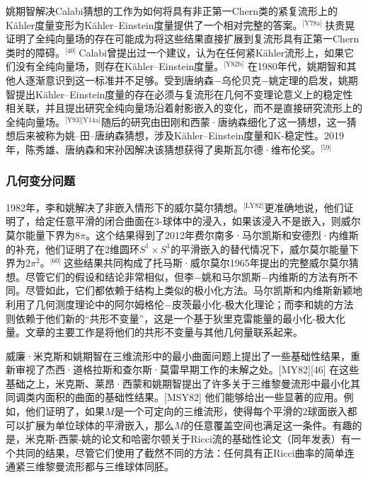 姚期智解决Calabi猜想的工作为如何将具有非正第一Chern类的紧复流形上的Kähler度量变形为Kähler–Einstein度量提供了一个相对完整的答案。\(^\text{[Y78a] }\)扶贵晃证明了全纯向量场的存在可能成为将这些结果直接扩展到复流形具有正第一Chern类时的障碍。\(^\text{[40] }\)Calabi曾提出过一个建议，认为在任何紧Kähler流形上，如果它们没有全纯向量场，则存在Kähler–Einstein度量。\(^\text{[Y82b]}\) 在1980年代，姚期智和其他人逐渐意识到这一标准并不足够。受到唐纳森−乌伦贝克−姚定理的启发，姚期智提出Kähler–Einstein度量的存在必须与复流形在几何不变理论意义上的稳定性相关联，并且提出研究全纯向量场沿着射影嵌入的变化，而不是直接研究流形上的全纯向量场。\(^\text{[Y93][Y14a]}\)随后的研究由田刚和西蒙·唐纳森细化了这一猜想，这一猜想后来被称为姚–田–唐纳森猜想，涉及Kähler–Einstein度量和K-稳定性。2019年，陈秀雄、唐纳森和宋孙因解决该猜想获得了奥斯瓦尔德·维布伦奖。\(^\text{[59] }\)
\subsubsection{几何变分问题}  
1982年，李和姚解决了非嵌入情形下的威尔莫尔猜想。\(^\text{[LY82]}\)更准确地说，他们证明了，给定任意平滑的闭合曲面在3-球体中的浸入，如果该浸入不是嵌入，则威尔莫尔能量下界为\(8\pi\)。这个结果得到了2012年费尔南多·马尔凯斯和安德烈·内维斯的补充，他们证明了在2维圆环\(S^1 \times S^1\)的平滑嵌入的替代情况下，威尔莫尔能量下界为\(2\pi^2\)。\(^\text{[60] }\)这些结果共同构成了托马斯·威尔莫尔1965年提出的完整威尔莫尔猜想。尽管它们的假设和结论非常相似，但李−姚和马尔凯斯−内维斯的方法有所不同。尽管如此，它们都依赖于结构上类似的极小化方法。马尔凯斯和内维斯新颖地利用了几何测度理论中的阿尔姆格伦−皮茨最小化-极大化理论；而李和姚的方法则依赖于他们新的“共形不变量”，这是一个基于狄里克雷能量的最小化-极大化量。文章的主要工作是将他们的共形不变量与其他几何量联系起来。

威廉·米克斯和姚期智在三维流形中的最小曲面问题上提出了一些基础性结果，重新审视了杰西·道格拉斯和查尔斯·莫雷早期工作的未解之处。[MY82][46] 在这些基础之上，米克斯、莱昂·西蒙和姚期智提出了许多关于三维黎曼流形中最小化其同调类内面积的曲面的基础性结果。[MSY82] 他们能够给出一些显著的应用。例如，他们证明了，如果\(M\)是一个可定向的三维流形，使得每个平滑的2球面嵌入都可以扩展为单位球体的平滑嵌入，那么\(M\)的任意覆盖空间也满足这一条件。有趣的是，米克斯-西蒙-姚的论文和哈密尔顿关于Ricci流的基础性论文（同年发表）有一个共同的结果，尽管它们使用了截然不同的方法：任何具有正Ricci曲率的简单连通紧三维黎曼流形都与三维球体同胚。
